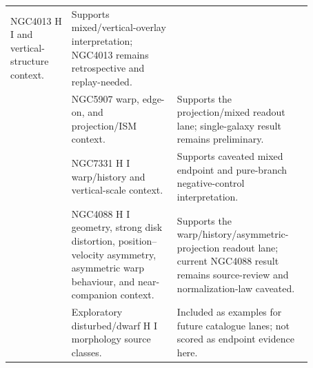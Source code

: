 \documentclass[11pt]{article}
\begin{document}
\begin{table}[H]
{\begin{tabular}{p{0.18\linewidth}p{0.31\linewidth}p{0.38\linewidth}}
NGC4013 H I and vertical-structure context. &
Supports mixed/vertical-overlay interpretation; NGC4013 remains retrospective
and replay-needed.\\
\cite{Sasaki1987NGC5907Warp,Shang1998NGC5907Warp,Wiegert2015EdgeOnISM} &
NGC5907 warp, edge-on, and projection/ISM context. &
Supports the projection/mixed readout lane; single-galaxy result remains
preliminary.\\
\cite{Bosma1978NGC7331HI,Patra2018NGC7331ScaleHeight} &
NGC7331 H I warp/history and vertical-scale context. &
Supports caveated mixed endpoint and pure-branch negative-control interpretation.\\
\cite{VerheijenSancisi2001UrsaMajorHI} &
NGC4088 H I geometry, strong disk distortion, position--velocity asymmetry,
asymmetric warp behaviour, and near-companion context. &
Supports the warp/history/asymmetric-projection readout lane; current NGC4088
result remains source-review and normalization-law caveated.\\
\cite{deBlok2020IC2574HI,WalterBrinks1999IC2574Holes,SanchezSalcedo2002IC2574Holes,Swaters2009LateTypeDwarfs} &
Exploratory disturbed/dwarf H I morphology source classes. &
Included as examples for future catalogue lanes; not scored as endpoint evidence
here.\\
\bottomrule
\end{tabular}
}
\end{table}




\end{document}
